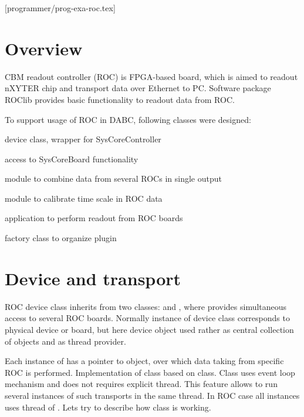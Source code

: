 [programmer/prog-exa-roc.tex]

\section{Overview}

CBM readout controller (ROC) is FPGA-based board, which is aimed to readout
nXYTER chip and transport data over Ethernet to PC. Software package ROClib 
provides basic functionality to readout data from ROC.
 
To support usage of ROC in DABC, following classes were designed:
\bbul
\item {}  device class, wrapper for SysCoreController 
\item {}  access to SysCoreBoard functionality 
\item {}  module to combine data from several ROCs in single output  
\item {}  module to calibrate time scale in ROC data  
\item {}  application to perform readout from ROC boards   
\item {}  factory class to organize plugin 
\ebul


\section{Device and transport}

ROC device class  inherits from two classes:  and ,
where  provides simultaneous access to several ROC boards. 
Normally instance of device class corresponds to physical device or board, 
but here device object used rather as central collection of  objects and
as thread provider.

Each instance of  has a pointer to  object,
over which data taking from specific ROC is performed. 
Implementation of class  based on  class.
Class  uses event loop mechanism and does not requires explicit thread.
This feature allows to run several instances of such transports in the same thread.
In ROC case all  instances uses thread of .     
Lets try to describe how class  is working.

